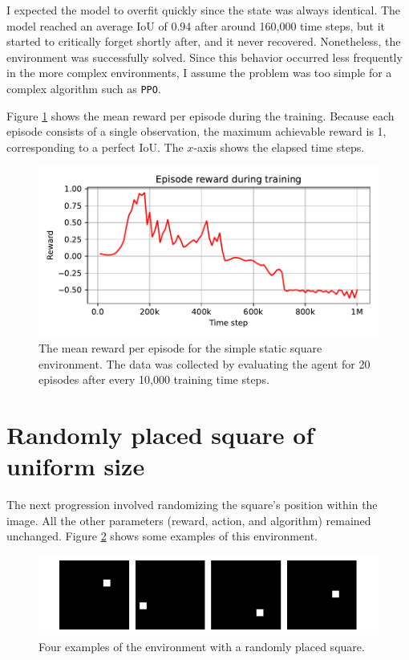 \documentclass[
  digital,     %
  oneside,     %
  nosansbold,  %
  nocolorbold, %
  lof,         %
  lot,         %
]{fithesis4}
\begin{document}
I expected the model to overfit quickly since the state was always identical. The model reached an average IoU of 0.94 after around 160,000 time steps, but it started to critically forget shortly after, and it never recovered. Nonetheless, the environment was successfully solved. Since this behavior occurred less frequently in the more complex environments, I assume the problem was too simple for a complex algorithm such as \texttt{PPO}.

Figure \ref{fig:v0_rew} shows the mean reward per episode during the training. Because each episode consists of a single observation, the maximum achievable reward is 1, corresponding to a perfect IoU. The $x$-axis shows the elapsed time steps.

\begin{figure}
    \includegraphics[width=1\linewidth]{graphs/v0.pdf}
    \caption{The mean reward per episode for the simple static square environment. The data was collected by evaluating the agent for 20 episodes after every 10,000 training time steps.}
    \label{fig:v0_rew}
\end{figure}

\section{Randomly placed square of uniform size}
The next progression involved randomizing the square's position within the image. All the other parameters (reward, action, and algorithm) remained unchanged. Figure \ref{fig:env1} shows some examples of this environment.

\begin{figure}
    \includegraphics[width=1\linewidth]{env_examples/env1.pdf}
    \caption{Four examples of the environment with a randomly placed square.}
    \label{fig:env1}
\end{figure}
\end{document}
